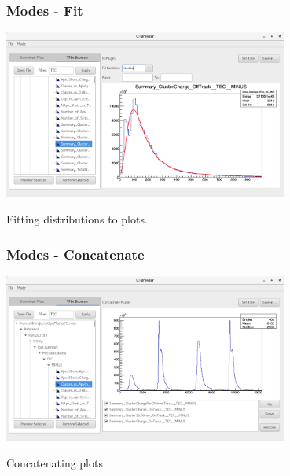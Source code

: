 \documentclass{beamer}
\begin{document}
\begin{frame}
\frametitle{Modes - Fit}
	\begin{center}
    \includegraphics[width=0.7\textwidth]{figures/fit.png}
    \end{center}
Fitting distributions to plots.
\end{frame}



\begin{frame}
\frametitle{Modes - Concatenate}
	\begin{center}
    \includegraphics[width=0.7\textwidth]{figures/concat.png}
    \end{center}
Concatenating plots
\end{frame}
\end{document}
